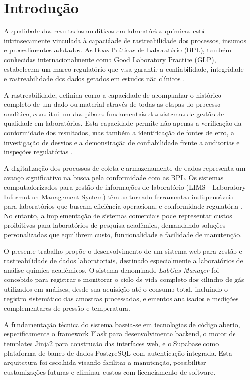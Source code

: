 \documentclass[12pt,a4paper]{article}
\providecommand\关键字[1]{\textbf{#1}}
\begin{document}

\section{Introdução}

A qualidade dos resultados analíticos em laboratórios químicos está intrinsecamente vinculada à capacidade de rastreabilidade dos processos, insumos e procedimentos adotados. As Boas Práticas de Laboratório (BPL), também conhecidas internacionalmente como Good Laboratory Practice (GLP), estabelecem um marco regulatório que visa garantir a confiabilidade, integridade e rastreabilidade dos dados gerados em estudos não clínicos \cite{anvisa2009,oecd1998}.

A rastreabilidade, definida como a capacidade de acompanhar o histórico completo de um dado ou material através de todas as etapas do processo analítico, constitui um dos pilares fundamentais dos sistemas de gestão de qualidade em laboratórios. Esta capacidade permite não apenas a verificação da conformidade dos resultados, mas também a identificação de fontes de erro, a investigação de desvios e a demonstração de confiabilidade frente a auditorias e inspeções regulatórias \cite{iso2017,inmetro2018}.

A digitalização dos processos de coleta e armazenamento de dados representa um avanço significativo na busca pela conformidade com as BPL. Os sistemas computadorizados para gestão de informações de laboratório (LIMS - Laboratory Information Management System) têm se tornado ferramentas indispensáveis para laboratórios que buscam eficiência operacional e conformidade regulatória \cite{allison2015,wang2018}. No entanto, a implementação de sistemas comerciais pode representar custos proibitivos para laboratórios de pesquisa acadêmica, demandando soluções personalizadas que equilibrem custo, funcionalidade e facilidade de manutenção.

O presente trabalho propõe o desenvolvimento de um sistema web para gestão e rastreabilidade de dados laboratoriais, destinado especialmente a laboratórios de análise química acadêmicos. O sistema denominado \textit{LabGas Manager} foi concebido para registrar e monitorar o ciclo de vida completo dos cilindro de gás utilizados em análises, desde sua aquisição até o consumo total, incluindo o registro sistemático das amostras processadas, elementos analisados e medições complementares de pressão e temperatura.

A fundamentação técnica do sistema baseia-se em tecnologias de código aberto, especificamente o framework Flask para desenvolvimento backend, o motor de templates Jinja2 para construção das interfaces web, e o Supabase como plataforma de banco de dados PostgreSQL com autenticação integrada. Esta arquitetura foi escolhida visando facilitar a manutenção, possibilitar customizações futuras e eliminar custos com licenciamento de software.
\end{document}
